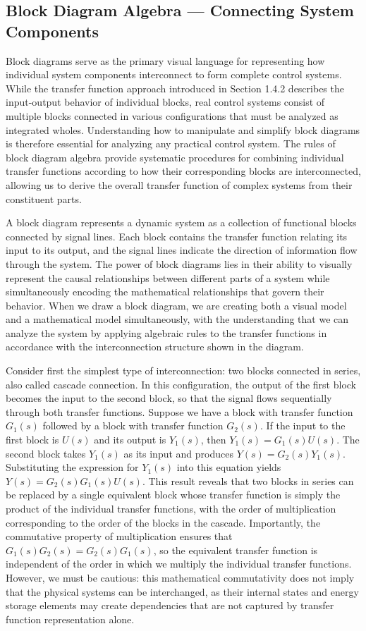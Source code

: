 \subsection{Block Diagram Algebra --- Connecting System Components}

Block diagrams serve as the primary visual language for representing how individual system components interconnect to form complete control systems. While the transfer function approach introduced in Section 1.4.2 describes the input-output behavior of individual blocks, real control systems consist of multiple blocks connected in various configurations that must be analyzed as integrated wholes. Understanding how to manipulate and simplify block diagrams is therefore essential for analyzing any practical control system. The rules of block diagram algebra provide systematic procedures for combining individual transfer functions according to how their corresponding blocks are interconnected, allowing us to derive the overall transfer function of complex systems from their constituent parts.

A block diagram represents a dynamic system as a collection of functional blocks connected by signal lines. Each block contains the transfer function relating its input to its output, and the signal lines indicate the direction of information flow through the system. The power of block diagrams lies in their ability to visually represent the causal relationships between different parts of a system while simultaneously encoding the mathematical relationships that govern their behavior. When we draw a block diagram, we are creating both a visual model and a mathematical model simultaneously, with the understanding that we can analyze the system by applying algebraic rules to the transfer functions in accordance with the interconnection structure shown in the diagram.

Consider first the simplest type of interconnection: two blocks connected in series, also called cascade connection. In this configuration, the output of the first block becomes the input to the second block, so that the signal flows sequentially through both transfer functions. Suppose we have a block with transfer function $G_1(s)$ followed by a block with transfer function $G_2(s)$. If the input to the first block is $U(s)$ and its output is $Y_1(s)$, then $Y_1(s) = G_1(s)U(s)$. The second block takes $Y_1(s)$ as its input and produces $Y(s) = G_2(s)Y_1(s)$. Substituting the expression for $Y_1(s)$ into this equation yields $Y(s) = G_2(s)G_1(s)U(s)$. This result reveals that two blocks in series can be replaced by a single equivalent block whose transfer function is simply the product of the individual transfer functions, with the order of multiplication corresponding to the order of the blocks in the cascade. Importantly, the commutative property of multiplication ensures that $G_1(s)G_2(s) = G_2(s)G_1(s)$, so the equivalent transfer function is independent of the order in which we multiply the individual transfer functions. However, we must be cautious: this mathematical commutativity does not imply that the physical systems can be interchanged, as their internal states and energy storage elements may create dependencies that are not captured by transfer function representation alone.

